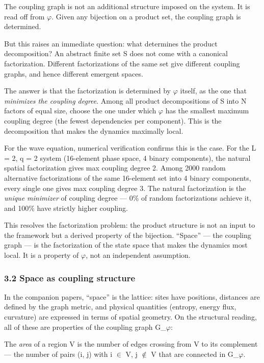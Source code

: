 \documentclass[
  11pt,
]{article}
\begin{document}
The coupling graph is not an additional structure imposed on the system.
It is read off from \ensuremath{\varphi}. Given any bijection on a product set, the
coupling graph is determined.

But this raises an immediate question: what determines the product
decomposition? An abstract finite set S does not come with a canonical
factorization. Different factorizations of the same set give different
coupling graphs, and hence different emergent spaces.

The answer is that the factorization is determined by \ensuremath{\varphi} itself, as the
one that \emph{minimizes the coupling degree}. Among all product
decompositions of S into N factors of equal size, choose the one under
which \ensuremath{\varphi} has the smallest maximum coupling degree (the fewest
dependencies per component). This is the decomposition that makes the
dynamics maximally local.

For the wave equation, numerical verification confirms this is the case.
For the L = 2, q = 2 system (16-element phase space, 4 binary
components), the natural spatial factorization gives max coupling degree
2. Among 2000 random alternative factorizations of the same 16-element
set into 4 binary components, every single one gives max coupling degree
3. The natural factorization is the \emph{unique minimizer} of coupling
degree --- 0\% of random factorizations achieve it, and 100\% have
strictly higher coupling.

This resolves the factorization problem: the product structure is not an
input to the framework but a derived property of the bijection.
``Space'' --- the coupling graph --- is the factorization of the state
space that makes the dynamics most local. It is a property of \ensuremath{\varphi}, not an
independent assumption.

\hypertarget{space-as-coupling-structure}{%
\subsubsection{3.2 Space as coupling
structure}\label{space-as-coupling-structure}}

In the companion papers, ``space'' is the lattice: sites have positions,
distances are defined by the graph metric, and physical quantities
(entropy, energy flux, curvature) are expressed in terms of spatial
geometry. On the structural reading, all of these are properties of the
coupling graph G\_\ensuremath{\varphi}:

The \emph{area} of a region V is the number of edges crossing from V to
its complement --- the number of pairs (i, j) with i \ensuremath{\in} V, j \ensuremath{\notin} V that are
connected in G\_\ensuremath{\varphi}.
\end{document}
